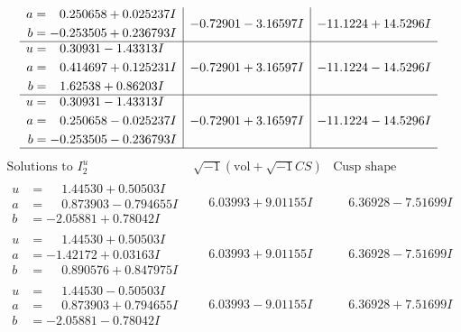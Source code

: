 \documentclass[1p]{elsarticle_modified}
\theoremstyle{definition}
\newcommand{\I}{\sqrt{-1}}
\begin{document}
$$\begin{array}{c|c|c}
\begin{aligned}
a &= \phantom{-}0.250658 + 0.025237 I \\
b &= -0.253505 + 0.236793 I\end{aligned}
 & -0.72901 - 3.16597 I & -11.1224 + 14.5296 I \\ \hline\begin{aligned}
u &= \phantom{-}0.30931 - 1.43313 I \\
a &= \phantom{-}0.414697 + 0.125231 I \\
b &= \phantom{-}1.62538 + 0.86203 I\end{aligned}
 & -0.72901 + 3.16597 I & -11.1224 - 14.5296 I \\ \hline\begin{aligned}
u &= \phantom{-}0.30931 - 1.43313 I \\
a &= \phantom{-}0.250658 - 0.025237 I \\
b &= -0.253505 - 0.236793 I\end{aligned}
 & -0.72901 + 3.16597 I & -11.1224 - 14.5296 I\\
 \hline 
 \end{array}$$\newpage$$\begin{array}{c|c|c}  
\text{Solutions to }I^u_{2}& \I (\text{vol} + \sqrt{-1}CS) & \text{Cusp shape}\\
 \hline 
\begin{aligned}
u &= \phantom{-}1.44530 + 0.50503 I \\
a &= \phantom{-}0.873903 - 0.794655 I \\
b &= -2.05881 + 0.78042 I\end{aligned}
 & \phantom{-}6.03993 + 9.01155 I & \phantom{-}6.36928 - 7.51699 I \\ \hline\begin{aligned}
u &= \phantom{-}1.44530 + 0.50503 I \\
a &= -1.42172 + 0.03163 I \\
b &= \phantom{-}0.890576 + 0.847975 I\end{aligned}
 & \phantom{-}6.03993 + 9.01155 I & \phantom{-}6.36928 - 7.51699 I \\ \hline\begin{aligned}
u &= \phantom{-}1.44530 - 0.50503 I \\
a &= \phantom{-}0.873903 + 0.794655 I \\
b &= -2.05881 - 0.78042 I\end{aligned}
 & \phantom{-}6.03993 - 9.01155 I & \phantom{-}6.36928 + 7.51699 I \\ \hline\begin{aligned}

\end{aligned}
\end{array}$$
\end{document}
